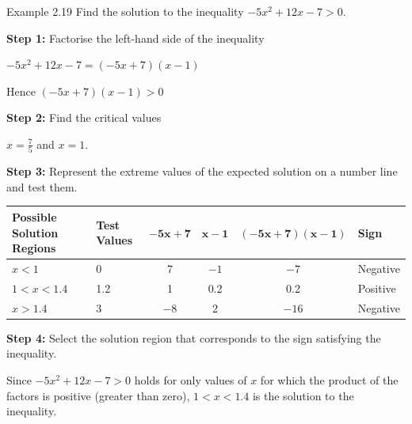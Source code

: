 \begin{example}{Example 2.19}
Find the solution to the inequality $-5x^2 + 12x - 7 > 0$.

\solution
\textbf{Step 1:} Factorise the left-hand side of the inequality

$-5x^2 + 12x - 7 = (-5x + 7)(x - 1)$

Hence $(-5x + 7)(x - 1) > 0$

\textbf{Step 2:} Find the critical values

$x = \frac{7}{5}$ and $x = 1$.

\textbf{Step 3:} Represent the extreme values of the expected solution on a number line
and test them.
\begin{center}
\end{center}

\begin{center}
\small\setlength{\tabcolsep}{4pt}
\begin{tabular}{|p{2.7cm}|p{1.4cm}|c|c|c|l|}
\hline
\textbf{Possible Solution Regions} & \textbf{Test Values} & $\boldsymbol{-5x + 7}$ &
$\boldsymbol{x - 1}$ & $\boldsymbol{(-5x + 7)(x - 1)}$ & \textbf{Sign} \\
\hline
$x < 1$ & 0 & 7 & $-1$ & $-7$ & Negative \\
\hline
$1 < x < 1.4$ & 1.2 & 1 & 0.2 & 0.2 & Positive \\
\hline
$x > 1.4$ & 3 & $-8$ & 2 & $-16$ & Negative \\
\hline
\end{tabular}
\end{center}

\textbf{Step 4:} Select the solution region that corresponds to the sign satisfying the
inequality.

Since $-5x^2 + 12x - 7 > 0$ holds for only values of $x$ for which the product of the
factors is positive (greater than zero), $1 < x < 1.4$ is the solution to the inequality.
\end{example}

